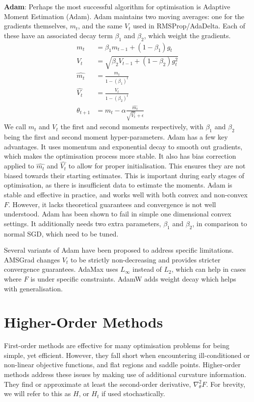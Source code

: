\textbf{Adam}: Perhaps the most successful algorithm for optimisation is Adaptive Moment Estimation (Adam). Adam maintains two moving averages: one for the gradients themselves, $m_t$, and the same $V_t$ used in RMSProp/AdaDelta. Each of these have an associated decay term $\beta_1$ and $\beta_2$, which weight the gradients.
\begin{align}
m_t &= \beta_1 m_{t-1} + (1 - \beta_1) g_t \\
V_t &= \sqrt{\beta_2 V_{t-1} + (1 - \beta_2) g_t^2} \\
\hat{m_t} &= \frac{m_t}{1 - (\beta_1)^t} \\
\hat{V_t} &= \frac{V_t}{1 - (\beta_2)^t} \\
\theta_{t+1} &= m_t - \alpha \frac{\hat{m_t}}{\sqrt{\hat{V_t}} + \epsilon}
\end{align}
We call $m_t$ and $V_t$ the first and second moments respectively, with $\beta_1$ and $\beta_2$ being the first and second moment hyper-parameters. Adam has a few key advantages. It uses momentum and exponential decay to smooth out gradients, which makes the optimisation process more stable. It also has bias correction applied to $\hat{m_t}$ and $\hat{V_t}$ to allow for proper initialisation. This ensures they are not biased towards their starting estimates. This is important during early stages of optimisation, as there is insufficient data to estimate the moments. Adam is stable and effective in practice, and works well with both convex and non-convex $F$. However, it lacks theoretical guarantees and convergence is not well understood. Adam has been shown to fail in simple one dimensional convex settings. It additionally needs two extra parameters, $\beta_1$ and $\beta_2$, in comparison to normal SGD, which need to be tuned.

Several variants of Adam have been proposed to address specific limitations. AMSGrad changes $V_t$ to be strictly non-decreasing and provides stricter convergence guarantees. AdaMax uses $L_\infty$ instead of $L_2$, which can help in cases where $F$ is under specific constraints. AdamW adds weight decay which helps with generalisation.

\section{Higher-Order Methods}
First-order methods are effective for many optimisation problems for being simple, yet efficient. However, they fall short when encountering ill-conditioned or non-linear objective functions, and flat regions and saddle points. Higher-order methods address these issues by making use of additional curvature information. They find or approximate at least the second-order derivative, $\nabla_{\theta}^{2}F$. For brevity, we will refer to this as $H$, or $H_t$ if used stochastically. 

